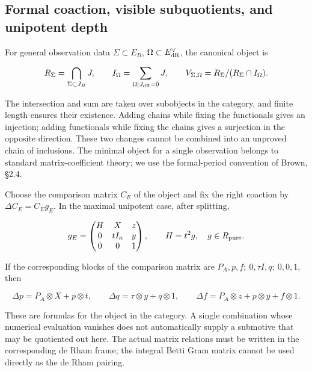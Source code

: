 \documentclass[11pt,a4paper,oneside]{article}
\theoremstyle{plain}
\theoremstyle{definition}
\theoremstyle{remark}
\numberwithin{equation}{section}
\begin{document}
\subsection{Formal coaction, visible subquotients, and unipotent depth}\label{sec:coaction:9}

For general observation data \(\Sigma\subset E_B\), \(\Omega\subset E_{\rm dR}^\vee\), the canonical object is

\begin{equation}
R_\Sigma=\bigcap_{\Sigma\subset J_B}J,\qquad
 I_\Omega=\sum_{\Omega|J_{\rm dR}=0}J,\qquad
 V_{\Sigma,\Omega}=R_\Sigma/(R_\Sigma\cap I_\Omega).     \label{eq:coaction:9.1}
\end{equation}

The intersection and sum are taken over subobjects in the category, and finite length ensures their existence. Adding chains while fixing the functionals gives an injection; adding functionals while fixing the chains gives a surjection in the opposite direction. These two changes cannot be combined into an unproved chain of inclusions. The minimal object for a single observation belongs to standard matrix-coefficient theory; we use the formal-period convention of Brown, §2.4.\cite{brownperiods}

Choose the comparison matrix \(C_E\) of the object and fix the right coaction by \(\Delta C_E=C_Eg_E\). In the maximal unipotent case, after splitting,

\begin{equation}
g_E=\begin{pmatrix}H&X&z\\0&tI_\kappa&y\\0&0&1\end{pmatrix},
 \qquad H=t^2g,\quad g\in R_{\rm pure}.
\end{equation}

If the corresponding blocks of the comparison matrix are \(P_A,p,f;\ 0,\tau I,q;\ 0,0,1\), then

\begin{equation}
\Delta p=P_A\otimes X+p\otimes t,\qquad
 \Delta q=\tau\otimes y+q\otimes1,\qquad
 \Delta f=P_A\otimes z+p\otimes y+f\otimes1.              \label{eq:coaction:9.2}
\end{equation}

These are formulas for the object in the category. A single combination whose numerical evaluation vanishes does not automatically supply a submotive that may be quotiented out here. The actual matrix relations must be written in the corresponding de Rham frame; the integral Betti Gram matrix cannot be used directly as the de Rham pairing.
\end{document}
